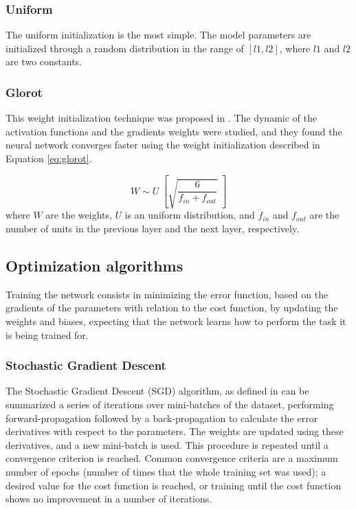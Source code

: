 \subsubsection{Uniform}
The uniform initialization is the most simple. The model parameters are initialized through a random distribution in the range of $[l1, l2]$, where $l1$ and $l2$ are two constants.

\subsubsection{Glorot}
This weight initialization technique was proposed in \cite{glorot2010understanding}. The dynamic of the activation functions and the gradients weights were studied, and they found the neural network converges faster using the weight initialization described in Equation \ref{eq:glorot}.

\begin{equation}
W \sim U \; \left[\sqrt{\frac{6}{f_{in}+f_{out}}}\; \right] 
\label{eq:glorot}
\end{equation}
where $W$ are the weights, $U$ is an uniform distribution, and $f_{in}$ and $f_{out}$ are the number of units in the previous layer and the next layer, respectively.

\subsection{Optimization algorithms}
Training the network consists in minimizing the error function, based on the gradients of the parameters with relation to the cost function, by updating the weights and biases, expecting that the network learns how to perform the task it is being trained for.

\subsubsection{Stochastic Gradient Descent}

The Stochastic Gradient Descent (SGD) algorithm, as defined in \cite{bishop2006pattern} can be summarized a series of iterations over mini-batches of the dataset, performing forward-propagation
followed by a back-propagation to calculate the error derivatives with respect to the parameters. The weights are updated using these derivatives, and a new mini-batch is used. This procedure is repeated until a convergence criterion is  reached. Common convergence criteria are a maximum number of epochs (number of times that the whole training set was used); a desired value for the cost function is reached, or training until the cost function shows no improvement in a number of iterations.

